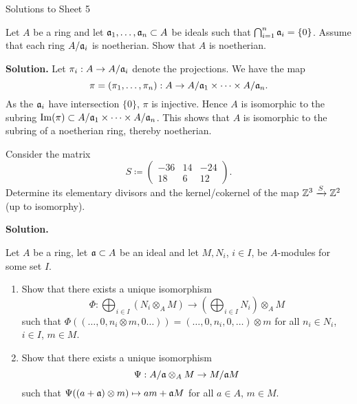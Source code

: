 \documentclass[a4paper,11pt]{article}
\begin{document}
\begin{center}
    \huge{Solutions to Sheet 5}
\end{center}

Let $A$ be a ring and let $\mathfrak{a}_1, \dots, \mathfrak{a}_n \subset A$ be ideals such
that $\bigcap_{i=1}^n \mathfrak{a}_i = \{0\}$. Assume that each ring 
$A / \mathfrak{a}_i$ is noetherian. Show that $A$ is noetherian. 

\textbf{Solution.}
Let $\pi_i : A \to A / \mathfrak{a}_i$ denote the projections. We have the map 
\begin{equation*}
 \pi = (\pi_1, \dots, \pi_n): A \to A/\mathfrak{a}_1 \times \dots \times A/\mathfrak{a}_n.
\end{equation*}
As the $\mathfrak{a}_i$ have intersection $\{0\}$, $\pi$ is injective. Hence $A$ is isomorphic
to the subring $\operatorname{Im}(\pi) \subset A/\mathfrak{a}_1 \times \dots \times A/\mathfrak{a}_n$. This 
shows that $A$ is isomorphic to the subring of a noetherian ring, thereby
noetherian.

Consider the matrix
\begin{equation*}
    S \coloneqq \begin{pmatrix}
        -36 & 14 & -24 \\
        18 & 6 & 12
    \end{pmatrix}.
\end{equation*}
Determine its elementary divisors and the kernel/cokernel of the map
$\mathbb{Z}^3 \xrightarrow{S} \mathbb{Z}^2$ (up to isomorphy).

\textbf{Solution.}  

Let $A$ be a ring, let $\mathfrak{a} \subset A$ be an ideal and let $M, N_i$, $i \in I$, be $A$-modules for some set $I$. 
\begin{enumerate}
    \item Show that there exists a unique isomorphism
        \begin{equation*}
            \Phi: \bigoplus_{i \in I} (N_i \otimes_A M) \to \left( \bigoplus_{i
                \in I} N_i \right ) \otimes_A M
        \end{equation*}
        such that $\Phi((\dots,0, n_i \otimes m, 0 \dots)) = (\dots, 0, n_i, 0,\dots) \otimes m$ for all $n_i \in N_i$, $i \in I$, $m \in M$. 
    \item Show that there exists a unique isomorphism
        \begin{equation*}
            \Psi: A / \mathfrak{a} \otimes_A M \to M/\mathfrak{a} M
        \end{equation*}
        such that $\Psi((a + \mathfrak{a}) \otimes m) \mapsto am + \mathfrak{a} M$ for all 
        $a \in A$, $m \in M$. 
\end{enumerate}
\end{document}
